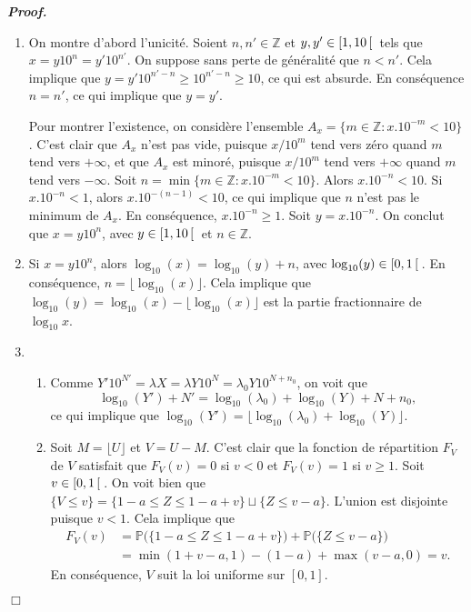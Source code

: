\documentclass[11pt,a4paper]{article}
\newenvironment{preuve}[1][]
{\vskip 2mm  \noindent\emph{\bf Proof#1. }}{$\Box$ \vskip 2mm}
\let\geq\geqslant
\let\leq\leqslant
\newcommand{\Z}{\mathbb{Z}}
\begin{document}
		\begin{preuve}
			\begin{enumerate}
				\item On montre d'abord l'unicité. 
				Soient $n, n' \in \Z$ et $y, y' \in [1,10 \hskip 0.6 mm [ \hskip 0.6mm$ tels que $x = y 10^{n} = y' 10^{n'}$. 
				On suppose sans perte de généralité que $n < n'$. 
				Cela implique que $y = y' 10^{n'-n} \geq 10^{n'-n} \geq 10$, ce qui est absurde. 
				En conséquence $n=n'$, ce qui implique que $y = y'$. 
				
				Pour montrer l'existence, on considère l'ensemble $A_{x} = \{ m \in \Z : x.10^{-m} < 10 \}$. 
				C'est clair que $A_{x}$ n'est pas vide, puisque $x/10^{m}$ tend vers zéro quand $m$ tend vers $+ \infty$, et que $A_{x}$ est minoré, puisque $x/10^{m}$ tend vers $+ \infty$ quand $m$ tend vers $- \infty$. 
				Soit $n = \min \{ m \in \Z : x.10^{-m} < 10 \}$. 
				Alors $x.10^{-n} < 10$. 
				Si $x.10^{-n} < 1$, alors $x.10^{-(n-1)} < 10$, ce qui implique que $n$ n'est pas le minimum de $A_{x}$. 
				En conséquence, $x.10^{-n} \geq 1$. 
				Soit $y = x.10^{-n}$. 
				On conclut que $x = y 10^{n}$, avec $y \in [1,10 \hskip 0.6 mm [ \hskip 0.6mm$ et $n \in \Z$. 
				
				\item Si $x = y 10^{n}$, alors $\log_{10}(x) = \log_{10}(y) + n$, avec $\log_{10}(y) \in [0,1 \hskip 0.6 mm [ \hskip 0.6mm$. 
				En conséquence, $n = \lfloor \log_{10}(x) \rfloor$. 
				Cela implique que $\log_{10}(y) = \log_{10}(x) - \lfloor \log_{10}(x) \rfloor$ est la partie fractionnaire de $\log_{10} x$. 
				
				\item 
				\begin{enumerate}[label=(\roman*)]
					\item Comme $Y' 10^{N'} = \lambda X = \lambda Y 10^{N} = \lambda_{0} Y 10^{N + n_{0}}$, on voit que 
					\[     \log_{10}(Y') + N' = \log_{10}(\lambda_{0})+ \log_{10}(Y) + N + n_{0},     \]
					ce qui implique que $\log_{10}(Y') = \lfloor \log_{10}(\lambda_{0})+ \log_{10}(Y) \rfloor$. 
					
					\item Soit $M = \lfloor U \rfloor$ et $V = U - M$.
					C'est clair que la fonction de répartition $F_{V}$ de $V$ satisfait que $F_{V}(v) = 0$ si $v < 0$ et $F_{V}(v)=1$ si $v \geq 1$. 
					Soit $v \in [0,1 \hskip 0.6mm [ \hskip 0.6mm$. 
					On voit bien que $\{ V \leq v \} = \{ 1 - a \leq Z \leq 1-a+v \} \sqcup \{ Z \leq v - a \}$. 
					L'union est disjointe puisque $v < 1$. 
					Cela implique que 
					\begin{align*}
					F_{V}(v) &= \mathbb{P}\big( \{ 1 - a \leq Z \leq 1-a+v \} \big) + \mathbb{P}\big(\{ Z \leq v -a \} \big) 
					\\
					&= \min(1+v-a,1) - (1-a) + \max(v-a,0) = v.    
					\end{align*} 
					En conséquence, $V$ suit la loi uniforme sur $[0,1]$. 
					

\end{enumerate}
\end{enumerate}
\end{preuve}
\end{document}
